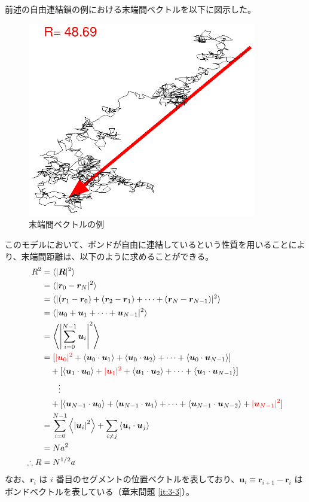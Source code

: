 \documentclass[11pt]{jsarticle}
\begin{document}
前述の自由連結鎖の例における末端間ベクトルを以下に図示した。
\begin{figure}[htb]
	\begin{center}
		\includegraphics[width=10cm]{figure/RF_EV.eps}
		\caption{末端間ベクトルの例}
		\label{fig: RF_EV}
	\end{center}
\end{figure}

このモデルにおいて、ボンドが自由に連結しているという性質を用いることにより、末端間距離は、以下のように求めることができる。
\begin{align}
R^2
	&= \langle |\bm{R}|^2 \rangle \notag \\
	&=\langle |\bm{r}_0 - \bm{r}_N|^2 \rangle \notag \\
	&=\langle |(\bm{r}_1 - \bm{r}_0) + (\bm{r}_2 - \bm{r}_1) + \cdots + (\bm{r}_N - \bm{r}_{N-1})|^2 \rangle \notag \\
	&=\langle |\bm{u}_0 + \bm{u}_1 + \cdots + \bm{u}_{N-1}|^2 \rangle \notag \\
	&=\left\langle \left|\sum_{i=0}^{N-1}\bm{u}_i \right|^2 \right\rangle \notag \\
	&= 
		[ 
		{\color{red} |\bm{u}_0|^2} + \langle \bm{u}_0 \cdot \bm{u}_1 \rangle + \langle \bm{u}_0 \cdot \bm{u}_2 \rangle + \cdots + \langle \bm{u}_0 \cdot \bm{u}_{N-1} \rangle 
		] \notag \\
	&\quad+ 
		[ 
		\langle \bm{u}_1 \cdot \bm{u}_0 \rangle + {\color{red} |\bm{u}_1|^2} + \langle \bm{u}_1 \cdot \bm{u}_2 \rangle + \cdots + \langle \bm{u}_1 \cdot \bm{u}_{N-1} \rangle 
		] \notag \\
	&\quad\quad \vdots \notag \\
	&\quad+ 
		[ 
		\langle \bm{u}_{N-1} \cdot \bm{u}_0 \rangle + \langle \bm{u}_{N-1} \cdot \bm{u}_1 \rangle + \cdots + \langle \bm{u}_{N-1} \cdot \bm{u}_{N-2} \rangle + {\color{red} |\bm{u}_{N-1}|^2} 
		] \notag \\
	&=\sum_{i=0}^{N-1} \left\langle \left|\bm{u}_i \right|^2 \right\rangle 
	+\sum_{i \neq j} \left\langle \bm{u}_i \cdot \bm{u}_j \right\rangle \notag \\
	&= N a^2 \notag \\
\therefore R &= N^{1/2}a
\label{eq:r2}
\end{align}
なお、$\bm{r}_i$ は $i$ 番目のセグメントの位置ベクトルを表しており、$\bm{u}_i \equiv \bm{r}_{i+1} - \bm{r}_i$ はボンドベクトルを表している（章末問題 \ref{it:3-3}）。
\end{document}
